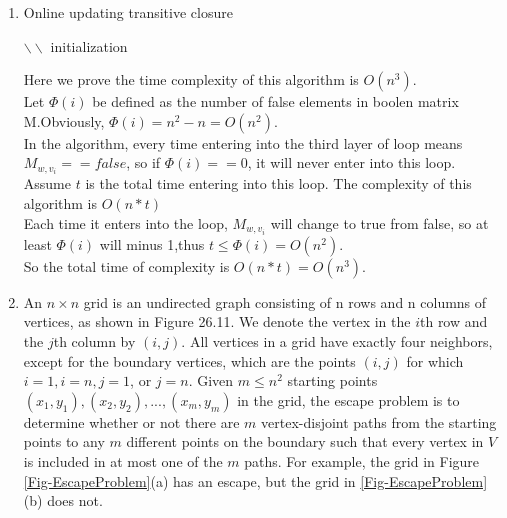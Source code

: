 \documentclass[12pt,a4paper]{article}
\makeatletter
\newtheorem*{solution}{Solution}
\theoremstyle{definition}
\renewenvironment{solution}[1][Solution] {\par\pushQED{\qed}\normalfont\topsep6\p@\@plus6\p@\relax\trivlist\item[\hskip\labelsep\bfseries#1\@addpunct{.}]\ignorespaces}{\popQED\endtrivlist\@endpefalse} \makeatother
\makeatother
\begin{document}
\begin{enumerate}
\begin{solution}
\begin{enumerate}
\begin{algorithm}[H]
    \caption{Online updating transitive closure}\label{transitive1}
    $\backslash\backslash$ initialization\\
	\end{algorithm}
	Here we prove the time complexity of this algorithm is $O(n^3)$.\\
	Let $\Phi(i)$ be defined as the number of false elements in boolen matrix M.Obviously, $\Phi(i)=n^2-n=O(n^2)$.\\
	In the algorithm, every time entering into the third layer of loop means $M_{w,v_i}==false$, so if $\Phi(i)==0$, it will never enter into this loop. Assume $t$ is the total time entering into this loop. The complexity of this algorithm is $O(n*t)$\\
	Each time it enters into the loop, $M_{w,v_i}$ will change to true from false, so at least $\Phi(i)$ will minus 1,thus $t\le\Phi(i)=O(n^2)$.\\
	So the total time of complexity is $O(n*t)=O(n^3)$.
	\end{enumerate}
	\end{solution}
	\item An $n\times n$ grid is an undirected graph consisting of n rows and n columns of vertices, as shown in Figure 26.11. We denote the vertex in the $i$th row and the $j$th column by $(i,j)$. All vertices in a grid have exactly four neighbors, except for the boundary vertices, which are the points $(i,j)$ for which $i = 1, i = n, j = 1$, or $j = n$.
    Given $m\leqslant n^2$ starting points $(x_1,y_1), (x_2, y_2), ... , (x_m, y_m)$ in the grid, the escape problem is to determine whether or not there are $m$ vertex-disjoint paths from the starting points to any $m$ different points on the boundary such that every vertex in $V$ is included in at most one of the $m$ paths. For example, the grid in Figure \ref{Fig-EscapeProblem}(a) has an escape, but the grid in \ref{Fig-EscapeProblem}(b) does not.

\end{enumerate}
\end{document}

